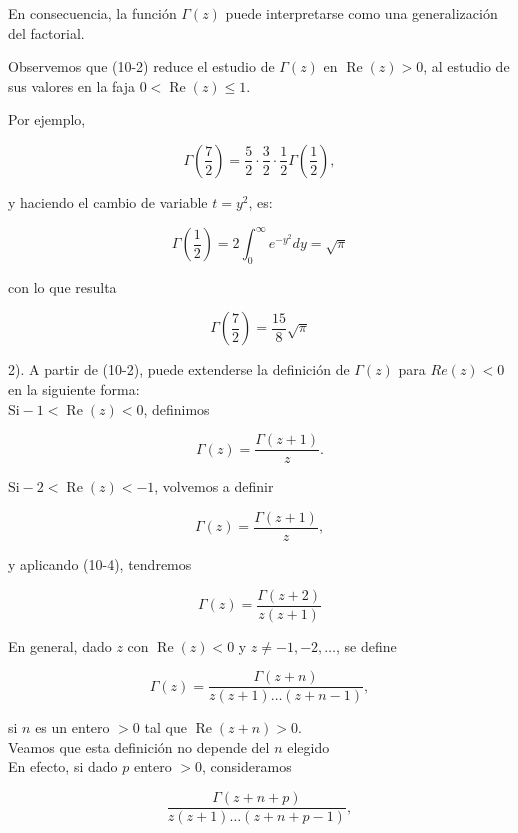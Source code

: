 \documentclass[10pt]{article}
\theoremstyle{plain}
\theoremstyle{definition}
\theoremstyle{remark}
\begin{document}
En consecuencia, la función $\Gamma(z)$ puede interpretarse como una generalización del factorial.

Observemos que (10-2) reduce el estudio de $\Gamma(z)$ en $\operatorname{Re}(z)>0$, al estudio de sus valores en la faja $0<\operatorname{Re}(z) \leqslant 1$.


Por ejemplo,

$$
\Gamma\left(\frac{7}{2}\right)=\frac{5}{2} \cdot \frac{3}{2} \cdot \frac{1}{2} \Gamma\left(\frac{1}{2}\right),
$$

y haciendo el cambio de variable $t=y^{2}$, es:


\begin{equation*}
\Gamma\left(\frac{1}{2}\right)=2 \int_{0}^{\infty} e^{-y^{2}} d y=\sqrt{\pi} \tag{10-3}
\end{equation*}


con lo que resulta

$$
\Gamma\left(\frac{7}{2}\right)=\frac{15}{8} \sqrt{\pi}
$$

2). A partir de (10-2), puede extenderse la definición de $\Gamma(z)$ para $R e(z)<0$ en la siguiente forma:\\
$\mathrm{Si}-1<\operatorname{Re}(z)<0$, definimos


\begin{equation*}
\Gamma(z)=\frac{\Gamma(z+1)}{z} . \tag{10-4}
\end{equation*}


$\mathrm{Si}-2<\operatorname{Re}(z)<-1$, volvemos a definir

$$
\Gamma(z)=\frac{\Gamma(z+1)}{z},
$$

y aplicando (10-4), tendremos

$$
\Gamma(z)=\frac{\Gamma(z+2)}{z(z+1)}
$$

En general, dado $z$ con $\operatorname{Re}(z)<0$ y $z \neq-1,-2, \ldots$, se define


\begin{equation*}
\Gamma(z)=\frac{\Gamma(z+n)}{z(z+1) \ldots(z+n-1)}, \tag{10-5}
\end{equation*}


si $n$ es un entero $>0$ tal que $\operatorname{Re}(z+n)>0$.\\
Veamos que esta definición no depende del $n$ elegido\\
En efecto, si dado $p$ entero $>0$, consideramos


\begin{equation*}
\frac{\Gamma(z+n+p)}{z(z+1) \ldots(z+n+p-1)}, \tag{10-6}
\end{equation*}
\end{document}

